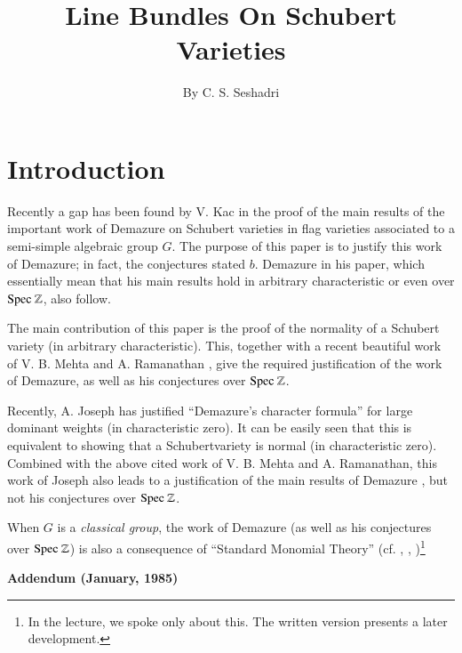 \title{Line Bundles On Schubert Varieties}

\author{By C. S. Seshadri}

\date{}
\maketitle

\setcounter{page}{379}
\setcounter{pageoriginal}{498}

\section{Introduction}\label{s1}\pageoriginale

Recently a gap has been found by V. Kac in the proof of the main
results of the important work of Demazure \cite{key1} on Schubert
varieties in flag varieties associated to a semi-simple algebraic
group $G$. The purpose of this paper is to justify this work of
Demazure; in fact, the conjectures stated $b$. Demazure in his paper,
which essentially mean that his main results hold in arbitrary
characteristic or even over $\spec\ \mathbb{Z}$, also follow.    

The main contribution of this paper is the proof of the normality of a Schubert variety (in arbitrary characteristic). This, together with a recent beautiful work of V. B. Mehta and A. Ramanathan \cite{key4}, give the required justification of the work of Demazure, as well as his conjectures over $\spec\ \mathbb{Z}$. 

Recently, A. Joseph \cite{key2} has justified ``Demazure's character formula'' for large dominant weights (in characteristic zero). It can be easily seen that this is equivalent to showing that a Schubert\pageoriginale variety is normal (in characteristic zero). Combined with the above cited work of V. B. Mehta and A. Ramanathan, this work of Joseph also leads to a justification of the main results of Demazure \cite{key1}, but not his conjectures over $\spec\ \mathbb{Z}$. 

When $G$ is a \textit{classical group}, the work of Demazure (as well as his conjectures over $\spec\ \mathbb{Z}$) is also a consequence of ``Standard Monomial Theory'' (cf. \cite{key3}, \cite{key5}, \cite{key6})\footnote{In the lecture, we spoke only about this. The written version presents a later development.}

\bigskip
\noindent
\textbf{Addendum (January, 1985)}

